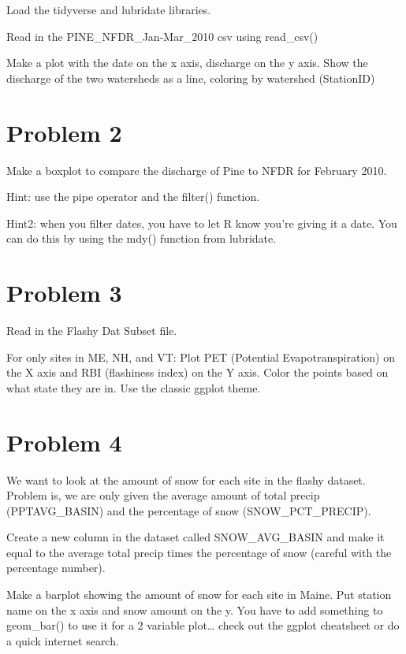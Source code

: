 \documentclass[
]{book}
\begin{document}
Load the tidyverse and lubridate libraries.

Read in the PINE\_NFDR\_Jan-Mar\_2010 csv using read\_csv()

Make a plot with the date on the x axis, discharge on the y axis. Show the discharge of the two watersheds as a line, coloring by watershed (StationID)

\hypertarget{problem-2}{%
\section{Problem 2}\label{problem-2}}

Make a boxplot to compare the discharge of Pine to NFDR for February 2010.

Hint: use the pipe operator and the filter() function.

Hint2: when you filter dates, you have to let R know you're giving it a date. You can do this by using the mdy() function from lubridate.

\hypertarget{problem-3}{%
\section{Problem 3}\label{problem-3}}

Read in the Flashy Dat Subset file.

For only sites in ME, NH, and VT: Plot PET (Potential Evapotranspiration) on the X axis and RBI (flashiness index) on the Y axis. Color the points based on what state they are in. Use the classic ggplot theme.

\hypertarget{problem-4}{%
\section{Problem 4}\label{problem-4}}

We want to look at the amount of snow for each site in the flashy dataset. Problem is, we are only given the average amount of total precip (PPTAVG\_BASIN) and the percentage of snow (SNOW\_PCT\_PRECIP).

Create a new column in the dataset called SNOW\_AVG\_BASIN and make it equal to the average total precip times the percentage of snow (careful with the percentage number).

Make a barplot showing the amount of snow for each site in Maine. Put station name on the x axis and snow amount on the y. You have to add something to geom\_bar() to use it for a 2 variable plot\ldots{} check out the ggplot cheatsheet or do a quick internet search.
\end{document}
